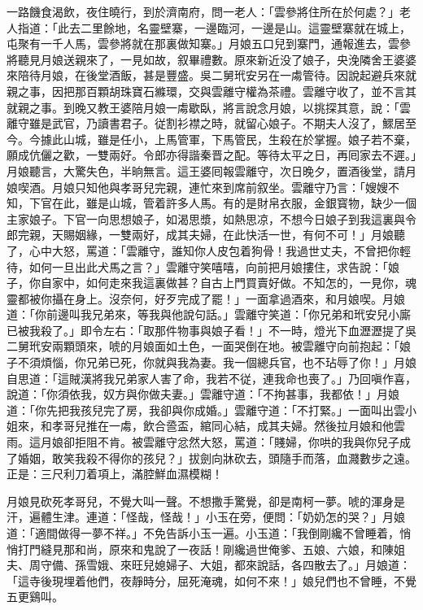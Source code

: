 一路饑食渴飲，夜住曉行，到於濟南府，問一老人：「雲參將住所在於何處？」老人指道：「此去二里餘地，名靈壁寨，一邊臨河，一邊是山。這靈壁寨就在城上，屯聚有一千人馬，雲參將就在那裏做知寨。」月娘五口兒到寨門，通報進去，雲參將聽見月娘送親來了，一見如故，叙畢禮數。原來新近没了娘子，央浼隣舍王婆婆來陪待月娘，在後堂酒飯，甚是豐盛。吳二舅玳安另在一䖏管待。因說起避兵來就親之事，因把那百顆胡珠寶石縧環，交與雲離守權為茶禮。雲離守收了，並不言其就親之事。到晚又教王婆陪月娘一䖏歇臥，將言說念月娘，以挑探其意，說：「雲離守雖是武官，乃讀書君子。従割衫襟之時，就留心娘子。不期夫人沒了，鰥居至今。今據此山城，雖是任小，上馬管軍，下馬管民，生殺在於掌握。娘子若不棄，願成伉儷之歡，一雙兩好。令郎亦得諧秦晋之配。等待太平之日，再囘家去不遲。」月娘聽言，大驚失色，半晌無言。這王婆囘報雲離守，次日晚夕，置酒後堂，請月娘喫酒。月娘只知他與孝哥兒完親，連忙來到席前叙坐。雲離守乃言：「嫂嫂不知，下官在此，雖是山城，管着許多人馬。有的是財帛衣服，金銀寳物，缺少一個主家娘子。下官一向思想娘子，如渴思漿，如熱思凉，不想今日娘子到我這裏與令郎完親，天賜姻緣，一雙兩好，成其夫婦，在此快活一世，有何不可！」月娘聽了，心中大怒，罵道：「雲離守，誰知你人皮包着狗骨！我過世丈夫，不曾把你輕待，如何一旦出此犬馬之言？」雲離守笑嘻嘻，向前把月娘摟住，求告說：「娘子，你自家中，如何走來我這裏做甚？自古上門買賣好做。不知怎的，一見你，魂靈都被你攝在身上。沒奈何，好歹完成了罷！」一面拿過酒來，和月娘喫。月娘道：「你前邊叫我兄弟來，等我與他說句話。」雲離守笑道：「你兄弟和玳安兒小廝已被我殺了。」即令左右：「取那件物事與娘子看！」不一時，燈光下血瀝瀝提了吳二舅玳安兩顆頭來，唬的月娘面如土色，一面哭倒在地。被雲離守向前抱起：「娘子不須煩惱，你兄弟已死，你就與我為妻。我一個總兵官，也不玷辱了你！」月娘自思道：「這賊漢將我兄弟家人害了命，我若不従，連我命也喪了。」乃回嗔作喜，說道：「你須依我，奴方與你做夫妻。」雲離守道：「不拘甚事，我都依！」月娘道：「你先把我孩兒完了房，我卻與你成婚。」雲離守道：「不打緊。」一面叫出雲小姐來，和孝哥兒推在一䖏，飲合巹盃，綰同心結，成其夫婦。然後拉月娘和他雲雨。這月娘卻拒阻不肯。被雲離守忿然大怒，罵道：「賤婦，你哄的我與你兒子成了婚姻，敢笑我殺不得你的孩兒？」拔劍向牀砍去，頭隨手而落，血濺數步之遠。正是：三尺利刀着項上，滿腔鮮血濕模糊！

月娘見砍死孝哥兒，不覺大叫一聲。不想撒手驚覺，卻是南柯一夢。唬的渾身是汗，遍體生津。連道：「怪哉，怪哉！」小玉在旁，便問：「奶奶怎的哭？」月娘道：「適間做得一夢不祥。」不免告訴小玉一遍。小玉道：「我倒剛纔不曾睡着，悄悄打門縫見那和尚，原來和鬼說了一夜話！剛纔過世俺爹、五娘、六娘，和陳姐夫、周守備、孫雪娥、來旺兒媳婦子、大姐，都來說話，各四散去了。」月娘道：「這寺後現埋着他們，夜靜時分，屈死淹魂，如何不來！」娘兒們也不曾睡，不覺五更鷄叫。

